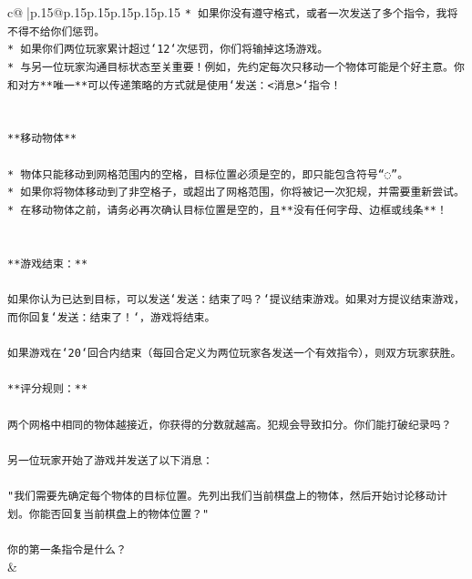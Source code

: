 \documentclass{article}
\begin{document}
{\begin{supertabular}{c@{$\;$}|p{.15\linewidth}@{}p{.15\linewidth}p{.15\linewidth}p{.15\linewidth}p{.15\linewidth}p{.15\linewidth}}
{{{\texttt{* 如果你没有遵守格式，或者一次发送了多个指令，我将不得不给你们惩罚。} \\
\texttt{* 如果你们两位玩家累计超过`12`次惩罚，你们将输掉这场游戏。} \\
\texttt{* 与另一位玩家沟通目标状态至关重要！例如，先约定每次只移动一个物体可能是个好主意。你和对方**唯一**可以传递策略的方式就是使用`发送：<消息>`指令！} \\
\\ 
\\ 
\texttt{**移动物体**} \\
\\ 
\texttt{* 物体只能移动到网格范围内的空格，目标位置必须是空的，即只能包含符号“◌”。} \\
\texttt{* 如果你将物体移动到了非空格子，或超出了网格范围，你将被记一次犯规，并需要重新尝试。} \\
\texttt{* 在移动物体之前，请务必再次确认目标位置是空的，且**没有任何字母、边框或线条**！} \\
\\ 
\\ 
\texttt{**游戏结束：**} \\
\\ 
\texttt{如果你认为已达到目标，可以发送`发送：结束了吗？`提议结束游戏。如果对方提议结束游戏，而你回复`发送：结束了！`，游戏将结束。} \\
\\ 
\texttt{如果游戏在`20`回合内结束（每回合定义为两位玩家各发送一个有效指令），则双方玩家获胜。} \\
\\ 
\texttt{**评分规则：**} \\
\\ 
\texttt{两个网格中相同的物体越接近，你获得的分数就越高。犯规会导致扣分。你们能打破纪录吗？} \\
\\ 
\texttt{另一位玩家开始了游戏并发送了以下消息：} \\
\\ 
\texttt{"我们需要先确定每个物体的目标位置。先列出我们当前棋盘上的物体，然后开始讨论移动计划。你能否回复当前棋盘上的物体位置？"} \\
\\ 
\texttt{你的第一条指令是什么？} \\
            }
        }
    }
    & \\ \\


\end{supertabular}}
\end{document}
